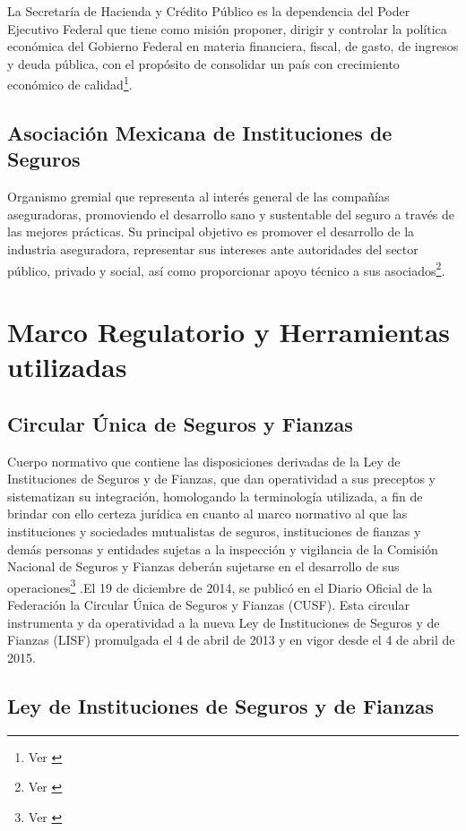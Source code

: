 \documentclass[11pt,twoside,openright,spanish]{report}
\numberwithin{equation}{chapter}
\numberwithin{figure}{chapter}
\numberwithin{table}{chapter}
\begin{document}
	La Secretaría de Hacienda y Crédito Público es la dependencia del Poder Ejecutivo Federal que tiene como misión proponer, dirigir y controlar la política económica del Gobierno Federal en materia financiera, fiscal, de gasto, de ingresos y deuda pública, con el propósito de consolidar un país con crecimiento económico de calidad\footnote{Ver \citet{NSHCP}}.
	
	
	\section{Asociación Mexicana de Instituciones de Seguros}
	
	Organismo gremial que representa al interés general de las compañías aseguradoras, promoviendo el desarrollo sano y sustentable del seguro a través de las mejores prácticas. Su principal objetivo es promover el desarrollo de la industria aseguradora, representar sus  intereses ante autoridades del sector público, privado y social, así como proporcionar apoyo técnico a sus asociados\footnote{Ver \citet{FAmis}}. 
	
	\chapter{Marco Regulatorio y Herramientas utilizadas}\label{tcyedb}
	
	\section{Circular Única de Seguros y Fianzas}

	
	Cuerpo normativo que contiene las disposiciones derivadas de la Ley de Instituciones de Seguros y de Fianzas, que dan operatividad a sus preceptos y sistematizan su integración, homologando la terminología utilizada, a fin de brindar con ello certeza jurídica en cuanto al marco normativo al que las instituciones y sociedades mutualistas de seguros, instituciones de fianzas y demás personas y entidades sujetas a la inspección y vigilancia de la Comisión Nacional de Seguros y Fianzas deberán sujetarse en el desarrollo de sus operaciones\footnote{Ver \citet{IDefCusf}} .El 19 de diciembre de 2014, se publicó en el Diario Oficial de la Federación la Circular Única de Seguros y Fianzas (CUSF). Esta circular instrumenta y da operatividad a la nueva Ley de Instituciones de Seguros y de Fianzas (LISF) promulgada el 4 de abril de 2013 y en vigor desde el 4 de abril de 2015. 
	
	\section{Ley de Instituciones de Seguros y de Fianzas}
\end{document}
